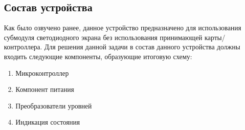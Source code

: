 \subsection{Состав устройства}

Как было озвучено ранее, данное устройство предназначено для использования субмодуля светодиодного экрана без использования принимающей карты/контроллера. Для решения данной задачи в состав данного устройства должны входить следующие компоненты, образующие итоговую схему:
\begin{enumerate}
    \item Микроконтроллер
    \item Компонент питания
    \item Преобразователи уровней
    \item Индикация состояния
\end{enumerate}